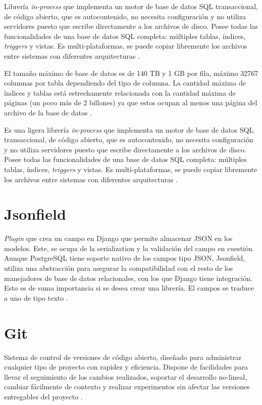 Librería \textit{in-process} que implementa un motor de base de datos SQL transaccional, de código abierto, que es autocontenido, no necesita configuración y no utiliza servidores puesto que escribe directamente a los archivos de disco. Posee todas las funcionalidades de una base de datos SQL completa: múltiples tablas, índices, \textit{triggers} y vistas.  Es multi-plataformas, se puede copiar libremente los archivos entre sistemas con diferentes arquitecturas \cite{SQLite}.

El tamaño máximo de base de datos es de 140 TB y 1 GB por fila, máximo 32767 columnas por tabla dependiendo del tipo de columna. La cantidad máxima de índices y tablas está estrechamente relacionada con la cantidad máxima de páginas (un poco más de 2 billones) ya que estos ocupan al menos una página del archivo de la base de datos \cite{SQLite}.


Es una ligera librería \textit{in-process} que implementa un motor de base de datos SQL transaccional, de código abierto, que es autocontenido, no necesita configuración y no utiliza servidores puesto que escribe directamente a los archivos de disco. Posee todas las funcionalidades de una base de datos SQL completa: múltiples tablas, índices, \textit{triggers} y vistas.  Es multi-plataformas, se puede copiar libremente los archivos entre sistemas con diferentes arquitecturas \cite{SQLite}. \\


\section{Jsonfield}

\textit{Plugin} que crea un campo en Django que permite almacenar JSON en los modelos. Este, se ocupa de la serialization y la validación del campo en cuestión. Aunque PostgreSQL tiene soporte nativo de los campos tipo JSON, Jsonfield, utiliza una abstracción para asegurar la compatibilidad con el resto de los manejadores de base de datos relacionales, con los que Django tiene integración. Esto es de suma importancia si se desea crear una librería. El campos se traduce a uno de tipo texto \cite{jsonfield}.

\section{Git}

Sistema de control de versiones de código abierto, diseñado para administrar cualquier tipo de proyecto con rapidez y eficiencia. Dispone de facilidades para llevar el seguimiento de los cambios realizados, soportar el desarrollo no-lineal, cambiar fácilmente de contexto y realizar experimentos sin afectar las versiones entregables del proyecto \cite{Git}.

